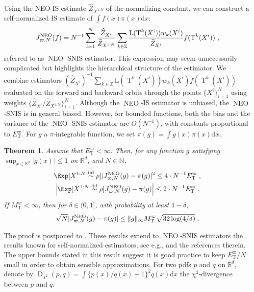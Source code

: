 \documentclass{article}
\newtheorem{theorem}{Theorem}
\def\simiid{\overset{\operatorname{iid}}{\sim}}
\def\IFIS{\ensuremath{\operatorname{NEO}}}
\def\NEO{{\small \IFIS}}
\def\transfo{\operatorname{T}}
\def\rmd{\operatorname{d}\hspace{-2pt}}
\def\rset{\mathbb{R}}
\def\nset{\mathbb{N}}
\def\dummy{f}
\def\rmd{\mathrm{d}}
\def\eqsp{\,}
\newcommand{\abs}[1]{\left\vert #1 \right\vert}
\def\eqsp{\;}
\newcommand{\1}{\mathds{1}}
\def\target{\pi}
\newcommand{\chunku}[3]{#1^{#2:#3}}
\newcommand{\estConstC}[1]{\widehat{Z}_{#1}}
\def\rset{\mathbb{R}}
\def\zset{\mathbb{Z}}
\def\nset{\mathbb{N}}
\def\rmd{\mathrm{d}}
\def\likelihood{\mathrm{L}}
\def\bound{M_{\transfo}^{\varpi}}
\def\infineSNIS{J^{\NEO}_{\varpi,N}}
\begin{document}
Using the NEO-IS estimate $\estConstC{\chunku{X}{1}{N}}$ of the normalizing constant, we can construct a self-normalized IS  estimate of $\int f(x) \target(x) \rmd x$: 
\begin{equation}
  \label{eq:def_estimator_naive_monte_carlo}
 \infineSNIS(\dummy)= N^{-1}\sum_{i=1}^{N}
  \frac{\estConstC{X^i}}{\estConstC{\chunku{X}{1}{N}}}\sum_{k\in \zset}\frac{\likelihood(\transfo^{k}(X^i)) w_k(X^i)}{\estConstC{X^i}} \dummy(\transfo^k(X^i))\eqsp,
  \end{equation}
referred to as \IFIS-SNIS estimator. This expression may seem unnecessarily complicated but highlights the hierarchical structure of the estimator. We combine estimators $(\estConstC{X^i})^{-1}\sum_{k\in \zset}\likelihood(\transfo^{k}(X^i)) w_k(X^i) \dummy(\transfo^k(X^i))$ evaluated on the forward and backward orbits through the points $\{ X^i \}_{i=1}^N$ using weights $\{\estConstC{X^i}/\estConstC{\chunku{X}{1}{N}}\}_{i=1}^N$. 
Although the \IFIS-IS estimator is unbiased, the \IFIS-SNIS is in general biased.  However, for bounded functions, both the bias and the variance of the \IFIS-SNIS estimator are $O(N^{-1})$, with constants proportional to $E_{\transfo}^\varpi$.  For $g$ a $\target$-integrable function, we set $\target(g)= \int g(x) \target(x) \rmd x$.
\begin{theorem}
\label{theo:bias_mse_snis}
Assume that $E^{\varpi}_{\transfo} < \infty$. Then, 
for any function $g$ satisfying $\sup_{x \in \rset^d} \abs{g(x)} \leq 1$ on $\rset^d$, and $N \in \nset$,
\begin{align}
     &\Exp[\chunku{X}{1}{N} \simiid \rho]{|\infineSNIS(g) - \pi(g)|^2} \leq 4 \cdot N^{-1} E^{\varpi}_{\transfo} \eqsp,\\
     &\left|\Exp[\chunku{X}{1}{N} \simiid \rho]{\infineSNIS(g) - \pi(g)}\right|\leq  2 \cdot N^{-1} E^{\varpi}_{\transfo} \eqsp.
\end{align}
If $\bound <\infty$, then for $\delta \in (0,1]$, with probability at least $1-\delta$, 
\begin{equation}
    \label{eq:exp_concentration}
   \sqrt{N}| \infineSNIS (g) - \pi(g) | \leq {\|g\| _{\infty} \bound \sqrt{32\log(4/\delta)} }\eqsp.
\end{equation}
\end{theorem}
The proof is postponed to . These results extend to \IFIS-SNIS estimators the results known for self-normalized estimators; see e.g., \cite{agapiou2017importance,akyildiz2021convergence} and the references therein. The upper bounds stated in this result suggest it is good practice to keep $E_{\transfo}^\varpi/N$ small in order to obtain sensible approximations. For two pdfs $p$ and $q$ on $\rset^d$, denote by $\operatorname{D}_{\chi^2}(p,q)= \int \{p(x)/q(x) -1\}^2 q(x) \rmd x$  the $\chi^2$-divergence between $p$ and $q$. 
\end{document}
